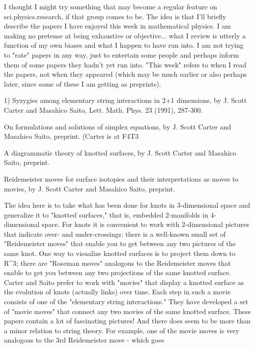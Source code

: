 
I thought I might try something that may become a regular feature
on sci.physics.research, if that group comes to be.   The idea is that
I'll briefly describe the papers I have enjoyed this week in mathematical 
physics.   I am making no pretense at being exhaustive or objective... 
what I review is utterly a function of my own biases and what I happen to
have run into.  I am not trying to "rate" papers in any way, just to
entertain some people and perhaps inform them of some papers they hadn't 
yet run into.  "This week" refers to when I read the papers, not when they 
appeared (which may be much earlier or also perhaps later, since some of these
I am getting as preprints).  

1)  Syzygies among elementary string interactions in 2+1 dimensions,
by J. Scott Carter and Masahico Saito, Lett. Math. Phys. 23 (1991), 
287-300.

On formulations and solutions of simplex equations, by J. Scott Carter and 
Masahico Saito, preprint.  (Carter is at 
F4T3%

A diagrammatic theory of knotted surfaces, by J. Scott Carter and 
Masahico Saito, preprint.

Reidemeister moves for surface isotopies and their interpretations as moves
to movies, by J. Scott Carter and Masahico Saito, preprint.

The idea here is to take what has been done for knots in 3-dimensional
space and generalize it to "knotted surfaces," that is, embedded 2-manifolds
in 4-dimensional space.  For knots it is convenient to work with 2-dimensional
pictures that indicate over- and under-crossings; there is a well-known
small set of "Reidemeister moves" that enable you to get between any two
pictures of the same knot.  One way to visualize knotted surfaces is
to project them down to R^3; there are "Roseman moves" analogous to the
Reidemeister moves that enable to get you between any two projections
of the same knotted surface.  Carter and Saito prefer to work with
"movies" that display a knotted surface as the evolution of knots
(actually links) over time. Each step in such a movie consists of one of
the "elementary string interactions."    They have developed a set of
"movie moves" that connect any two movies of the same knotted surface.
These papers contain a lot of fascinating pictures!  And there does seem
to be more than a minor relation to string theory.  For example, one of
the movie moves is very analogous to the 3rd Reidemeister move - which goes














